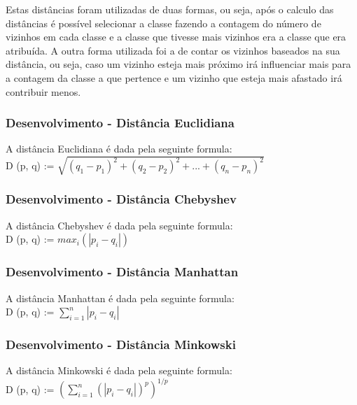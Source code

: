 \documentclass[portugues,final]{revdetua}
\begin{document}
Estas distâncias foram utilizadas de duas formas, ou seja, após o calculo das distâncias é possível selecionar a classe fazendo a contagem do número de vizinhos em cada classe e a classe que tivesse mais vizinhos era a classe que era atribuída. A outra forma utilizada foi a de contar os vizinhos baseados na sua distância, ou seja, caso um vizinho esteja mais próximo irá influenciar mais para a contagem da classe a que pertence e um vizinho que esteja mais afastado irá contribuir menos.\\

\subsubsection{Desenvolvimento - Distância Euclidiana}

A distância Euclidiana é dada pela seguinte formula:\\

D (p, q) := $\sqrt{(q_1 - p_1)^2 + (q_2 - p_2)^2 + ... + (q_n - p_n)^2}$\\

\subsubsection{Desenvolvimento - Distância Chebyshev}

A distância Chebyshev é dada pela seguinte formula:\\

D (p, q) := $max_i(|p_i - q_i|)$\\

\subsubsection{Desenvolvimento - Distância Manhattan}

A distância Manhattan é dada pela seguinte formula:\\

D (p, q) := $\sum_{i=1}^{n}|p_i - q_i|$\\

\subsubsection{Desenvolvimento - Distância Minkowski}

A distância Minkowski é dada pela seguinte formula:\\

D (p, q) := $(\sum_{i=1}^{n}(|p_i - q_i|)^p)^{1/p}$\\
\end{document}
